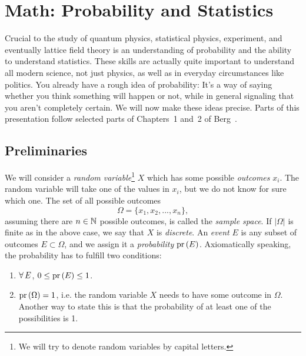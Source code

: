 \chapter{Math: Probability and Statistics}\label{ch:probability}

Crucial to the study of quantum physics, statistical physics, experiment, and
eventually lattice field theory is an understanding of probability and the
ability to understand statistics. These skills are actually quite important to
understand all modern science, not just physics, as well as in everyday
circumstances like politics.
You already have a rough idea of probability: It's a way of saying whether you
think something will happen or not, while in general signaling that you aren't
completely certain. We will now make these ideas precise.
Parts of this presentation follow selected parts
of Chapters~1 and~2 of Berg~\cite{berg_markov_2004}.


\section{Preliminaries}\label{sec:probprelim}


We will consider a {\it random variable}\footnote{
We will try to denote random variables by capital letters.} $X$ which
has some possible {\it outcomes} $x_i$. The random variable will take
one of the values in $x_i$, but we do not know for sure which one.
The set of all possible outcomes
\begin{equation}
  \Omega=\{x_1,x_2,...,x_n\},
\end{equation}
assuming there are $n\in\mathbb{N}$ possible outcomes, is called the {\it sample
space}. If $|\Omega|$ is finite as in the above case, we
say that $X$ is {\it discrete}. An {\it event} $E$
is any subset of outcomes $E\subset\Omega$, and we assign it a {\it
probability} $\operatorname{pr}\left(E\right)$. Axiomatically speaking, the
probability has to fulfill two conditions:
\begin{enumerate}
  \item $\operatorname{\forall} E$, $0\leq\operatorname{pr}\left(E\right)\leq1$.
  \item $\operatorname{pr}\left(\Omega\right)=1$, i.e. the random variable $X$ needs to have some outcome
in $\Omega$. Another way to state this is that the probability of at least one
of the possibilities is 1.
\end{enumerate}


